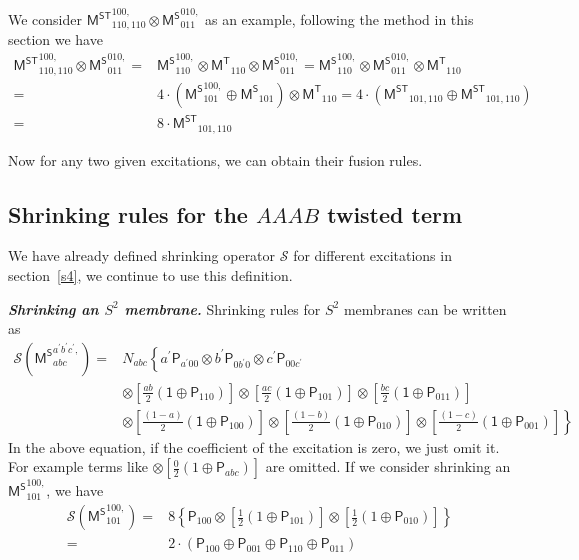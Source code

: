 \documentclass[11pt,nofootinbib,preprint]{revtex4-1}
\begin{document}
We consider $\mathsf{M^{ST}}_{110,110}^{100,}\otimes \mathsf{M^S}_{011}^{010,}$ as an example, following the method in this section we have 
\begin{align}
	\mathsf{M^{ST}}_{110,110}^{100,}\otimes \mathsf{M^S}_{011}^{010,}=&\mathsf{M^S}_{110}^{100,}\otimes \mathsf{M^T}_{110}\otimes \mathsf{M^S}_{011}^{010,}=\mathsf{M^S}_{110}^{100,}\otimes \mathsf{M^S}_{011}^{010,}\otimes \mathsf{M^T}_{110} \nonumber
	\\
	=&4\cdot \left( \mathsf{M^S}_{101}^{100,}\oplus \mathsf{M^S}_{101} \right) \otimes \mathsf{M^T}_{110}=4\cdot \left( \mathsf{M^{ST}}_{101,110}\oplus \mathsf{M^{ST}}_{101,110} \right) \nonumber
	\\
	=&8\cdot \mathsf{M^{ST}}_{101,110}
\end{align}

Now for any two given excitations, we can obtain their fusion rules. 
\subsection{Shrinking rules for the $AAAB$ twisted term}
We have already defined shrinking operator $\mathcal{S}$ for different excitations in section~\ref{s4}, we continue to use this definition. 

\textbf{\textit{Shrinking an $S^2$ membrane.}}
Shrinking rules for $S^2$ membranes can be written as 
\begin{align}
	\mathcal{S} \left( \mathsf{M^S}_{abc}^{a^{\prime}b^{\prime}c^{\prime},} \right) =&N_{abc}\left\{ a^{\prime}\mathsf{P}_{a^{\prime}00}\otimes b^{\prime}\mathsf{P}_{0b^{\prime}0}\otimes c^{\prime}\mathsf{P}_{00c^{\prime}} \right. \nonumber
	\\
	&\otimes \left[ \frac{ab}{2}\left( \mathsf{1}\oplus \mathsf{P}_{110} \right) \right] \otimes \left[ \frac{ac}{2}\left( \mathsf{1}\oplus \mathsf{P}_{101} \right) \right] \otimes \left[ \frac{bc}{2}\left( \mathsf{1}\oplus \mathsf{P}_{011} \right) \right] \nonumber
	\\
	&\left. \otimes \left[ \frac{\left( 1-a \right)}{2}\left( \mathsf{1}\oplus \mathsf{P}_{100} \right) \right] \otimes \left[ \frac{\left( 1-b \right)}{2}\left( \mathsf{1}\oplus \mathsf{P}_{010} \right) \right] \otimes \left[ \frac{\left( 1-c \right)}{2}\left( \mathsf{1}\oplus \mathsf{P}_{001} \right) \right] \right\} 
\end{align}
In the above equation, if the coefficient of the excitation is zero, we just omit it. For example terms like $\otimes \left[ \frac{0}{2}\left( 1\oplus \mathsf{P}_{abc} \right) \right] $ are omitted. If we consider shrinking an $\mathsf{M^S}_{101}^{100,}$, we have 
\begin{align}
	\mathcal{S} \left( {\mathsf{M}^{\mathsf{S}}}_{101}^{100,} \right) =&8\left\{ \mathsf{P}_{100}\otimes \left[ \frac{1}{2}\left( 1\oplus \mathsf{P}_{101} \right) \right] \otimes \left[ \frac{1}{2}\left( 1\oplus \mathsf{P}_{010} \right) \right] \right\} \nonumber
	\\
	=&2\cdot \left( \mathsf{P}_{100}\oplus \mathsf{P}_{001}\oplus \mathsf{P}_{110}\oplus \mathsf{P}_{011} \right) 
\end{align}
\end{document}
